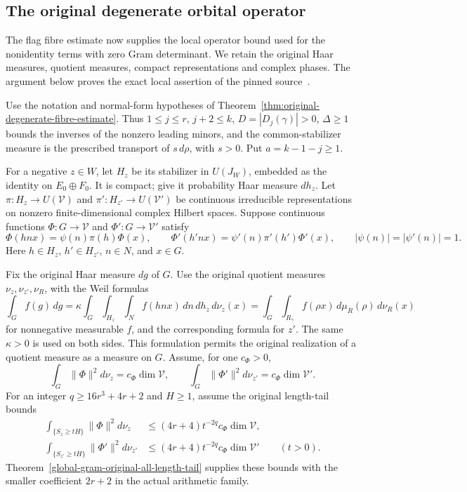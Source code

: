 \subsection{The original degenerate orbital operator}
\label{shared-original-degenerate-operator}

The flag fibre estimate now supplies the local operator bound used
for the nonidentity terms with zero Gram determinant.  We retain
the original Haar measures, quotient measures, compact
representations and complex phases.  The argument below proves
the exact local assertion of the pinned
source~\cite{global-gram-degenerate-operator-source}.

Use the notation and normal-form hypotheses of
Theorem~\ref{thm:original-degenerate-fibre-estimate}.  Thus
$1\le j\le r$, $j+2\le k$, $D=|D_j(\gamma)|>0$,
$\Delta\ge1$ bounds the inverses of the nonzero leading minors,
and the common-stabilizer measure is the prescribed transport of
$s\,d\rho$, with $s>0$.  Put $a=k-1-j\ge1$.

For a negative $z\in W$, let $H_z$ be its stabilizer in
$U(J_W)$, embedded as the identity on $E_0\oplus F_0$.
It is compact; give it probability Haar measure $dh_z$.
Let $\pi:H_z\to U(\mathcal V)$ and
$\pi':H_{z'}\to U(\mathcal V')$ be continuous irreducible
representations on nonzero finite-dimensional complex Hilbert
spaces.  Suppose continuous functions $\Phi:G\to\mathcal V$ and
$\Phi':G\to\mathcal V'$ satisfy
\[
 \Phi(hnx)=\psi(n)\pi(h)\Phi(x),\qquad
 \Phi'(h'nx)=\psi'(n)\pi'(h')\Phi'(x),
 \qquad |\psi(n)|=|\psi'(n)|=1.
\]
Here $h\in H_z$, $h'\in H_{z'}$, $n\in N$, and $x\in G$.

Fix the original Haar measure $dg$ of $G$.  Use the original
quotient measures $\nu_z,\nu_{z'},\nu_R$, with the Weil formulas
\[
 \int_G f(g)\,dg
   =\kappa\int_G\int_{H_z}\int_N f(hnx)\,dn\,dh_z\,d\nu_z(x)
   =\int_G\int_{R_\gamma}f(\rho x)\,d\mu_R(\rho)\,d\nu_R(x)
\]
for nonnegative measurable $f$, and the corresponding formula
for $z'$.  The same $\kappa>0$ is used on both sides.  This
formulation permits the original realization of a quotient measure
as a measure on $G$.
Assume, for one $c_\Phi>0$,
\[
 \int_G\|\Phi\|^2d\nu_z=c_\Phi\dim\mathcal V,\qquad
 \int_G\|\Phi'\|^2d\nu_{z'}=c_\Phi\dim\mathcal V'.
\]
For an integer $q\ge16r^3+4r+2$ and $H\ge1$, assume the
original length-tail bounds
\begin{align*}
 \int_{\{S_z\ge tH\}}\|\Phi\|^2d\nu_z
       &\le(4r+4)t^{-2q}c_\Phi\dim\mathcal V,\\
 \int_{\{S_{z'}\ge tH\}}\|\Phi'\|^2d\nu_{z'}
       &\le(4r+4)t^{-2q}c_\Phi\dim\mathcal V'
                                     \qquad(t>0).
\end{align*}
Theorem~\ref{global-gram-original-all-length-tail} supplies
these bounds with the smaller coefficient $2r+2$ in the actual
arithmetic family.


